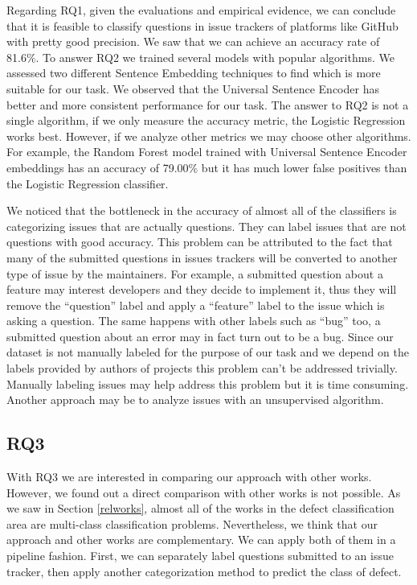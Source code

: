 \documentclass[conference]{IEEEtran}
\begin{document}
Regarding RQ1, given the evaluations and empirical evidence, we can conclude that it is feasible to classify 
questions in issue trackers of platforms like GitHub with pretty good precision. We saw that we can achieve 
an accuracy rate of 81.6\%. To answer RQ2 we trained several models with popular algorithms. We assessed two
different Sentence Embedding techniques to find which is more suitable for our task. We observed that the 
Universal Sentence Encoder has better and more consistent performance for our task. The answer to RQ2 is not a 
single algorithm, if we only measure the accuracy metric, the Logistic Regression works best. However, if we
analyze other metrics we may choose other algorithms. For example, the Random Forest model trained with
Universal Sentence Encoder embeddings has an accuracy of 79.00\% but it has much lower false positives than the 
Logistic Regression classifier.

We noticed that the bottleneck in the accuracy of almost all of the classifiers is categorizing issues that are 
actually questions. They can label issues that are not questions with good accuracy. This problem can be attributed 
to the fact that many of the submitted questions in issues trackers will be converted to another type of issue by 
the maintainers. For example, a submitted question about a feature may interest developers and they decide to 
implement it, thus they will remove the ``question'' label and apply a ``feature'' label to the issue which is 
asking a question. The same happens with other labels such as ``bug'' too, a submitted question about an error 
may in fact turn out to be a bug. Since our dataset is not manually labeled for the purpose of our task and we 
depend on the labels provided by authors of projects this problem can't be addressed trivially. 
Manually labeling issues may help address this problem but it is time consuming. Another approach may be to analyze 
issues with an unsupervised algorithm.

\subsection{RQ3}
With RQ3 we are interested in comparing our approach with other works. However, we found out 
a direct comparison with other works is not possible. As we saw in Section \ref{relworks}, almost 
all of the works in the defect classification area are multi-class classification problems. 
Nevertheless, we think that our approach and other works are complementary.
We can apply both of them in a pipeline fashion. First, we can separately label questions submitted to an 
issue tracker, then apply another categorization method to predict the class of defect.
\end{document}
